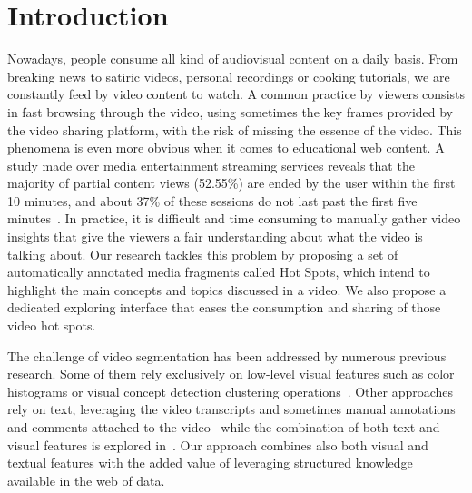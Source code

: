 \documentclass{llncs}
\begin{document}
\section{Introduction}
\label{sec:introduction}
Nowadays, people consume all kind of audiovisual content on a daily basis. From breaking news to satiric videos, personal recordings or cooking tutorials, we are constantly feed by video content to watch. A common practice by viewers consists in fast browsing through the video, using sometimes the key frames provided by the video sharing platform, with the risk of missing the essence of the video. This phenomena is even more obvious when it comes to educational web content. A study made over media entertainment streaming services reveals that the majority of partial content views (52.55\%) are ended by the user within the first 10 minutes, and about 37\% of these sessions do not last past the first five minutes~\cite{Yu2006}. In practice, it is difficult and time consuming to manually gather video insights that give the viewers a fair understanding about what the video is talking about. Our research tackles this problem by proposing a set of automatically annotated media fragments called Hot Spots, which intend to highlight the main concepts and topics discussed in a video. We also propose a dedicated exploring interface that eases the consumption and sharing of those video hot spots.

The challenge of video segmentation has been addressed by numerous previous research. Some of them rely exclusively on low-level visual features such as color histograms or visual concept detection clustering operations~\cite{snoek2005multimodal}. Other approaches rely on text, leveraging the video transcripts and sometimes manual annotations and comments attached to the video~\cite{chang1992image} while the combination of both text and visual features is explored in~\cite{chang2005combining}. Our approach combines also both visual and textual features with the added value of leveraging structured knowledge available in the web of data.

\end{document}
